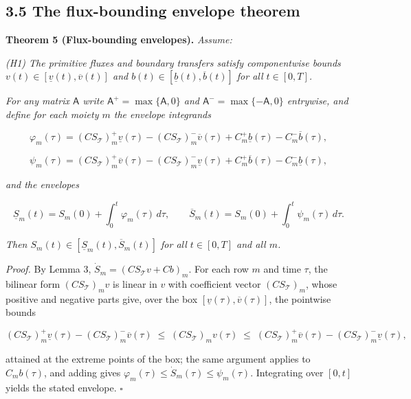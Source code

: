 \documentclass[11pt]{article}
\begin{document}
\subsection*{3.5 The flux-bounding envelope theorem}\label{35-the-flux-bounding-envelope-theorem}

\textbf{Theorem 5 (Flux-bounding envelopes).} \emph{Assume:}

\emph{(H1) The primitive fluxes and boundary transfers satisfy componentwise bounds \(v(t) \in [\underline{v}(t),\allowbreak{} \overline{v}(t)]\) and \(b(t) \in [\underline{b}(t),\allowbreak{} \overline{b}(t)]\) for all \(t \in [0,T]\).}

\emph{For any matrix \(\mathsf{A}\) write \(\mathsf{A}^{+\allowbreak{}} =\allowbreak{} \max\{\mathsf{A},\allowbreak{} 0\}\) and \(\mathsf{A}^{-} =\allowbreak{} \max\{-\mathsf{A},\allowbreak{} 0\}\) entrywise, and define for each moiety \(m\) the envelope integrands} 

$$\varphi_m(\tau) = (C S_{\mathcal{T}})_{m}^{+} \underline{v}(\tau) - (C S_{\mathcal{T}})_{m}^{-} \overline{v}(\tau) + C_{m}^{+} \underline{b}(\tau) - C_{m}^{-} \overline{b}(\tau),$$

 

$$\psi_m(\tau) = (C S_{\mathcal{T}})_{m}^{+} \overline{v}(\tau) - (C S_{\mathcal{T}})_{m}^{-} \underline{v}(\tau) + C_{m}^{+} \overline{b}(\tau) - C_{m}^{-} \underline{b}(\tau),$$

 \emph{and the envelopes} 

$$\underline{S}_m(t) = S_m(0) + \int_0^t \varphi_m(\tau)\, d\tau, \qquad \overline{S}_m(t) = S_m(0) + \int_0^t \psi_m(\tau)\, d\tau.$$

 \emph{Then \(S_m(t) \in [\underline{S}_m(t),\allowbreak{} \overline{S}_m(t)]\) for all \(t \in [0,T]\) and all \(m\).}

\emph{Proof.} By Lemma 3, \(\dot S_m =\allowbreak{} (C S_{\mathcal{T}} v +\allowbreak{} Cb)_m\). For each row \(m\) and time \(\tau\), the bilinear form \((C S_{\mathcal{T}})_m v\) is linear in \(v\) with coefficient vector \((C S_{\mathcal{T}})_m\), whose positive and negative parts give, over the box \([\underline{v}(\tau),\allowbreak{} \overline{v}(\tau)]\), the pointwise bounds 

$$(C S_{\mathcal{T}})_{m}^{+} \underline{v}(\tau) - (C S_{\mathcal{T}})_{m}^{-} \overline{v}(\tau) \;\le\; (C S_{\mathcal{T}})_m v(\tau) \;\le\; (C S_{\mathcal{T}})_{m}^{+} \overline{v}(\tau) - (C S_{\mathcal{T}})_{m}^{-} \underline{v}(\tau),$$

 attained at the extreme points of the box; the same argument applies to \(C_m b(\tau)\), and adding gives \(\varphi_m(\tau) \le \dot S_m(\tau) \le \psi_m(\tau)\). Integrating over \([0,t]\) yields the stated envelope. \(\square\)
\end{document}
